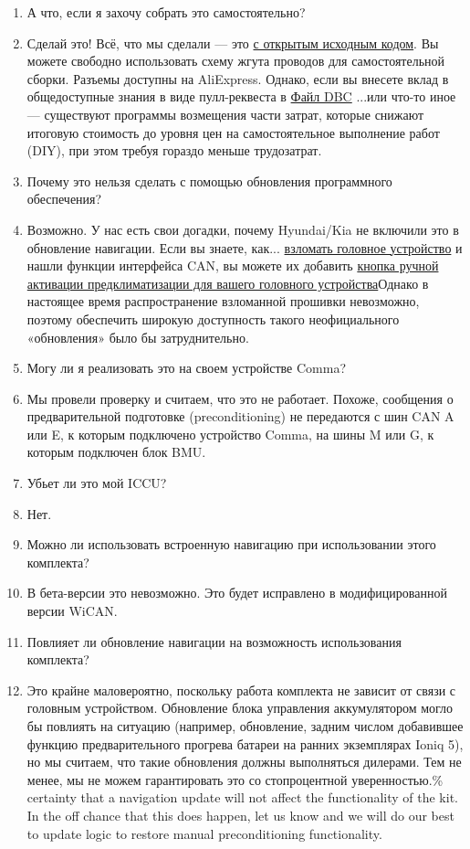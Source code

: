 \documentclass[superscriptaddress,onecolumn,floatfix]{revtex4-2}
\begin{document}
\begin{enumerate}
  \item[В:] А что, если я захочу собрать это самостоятельно?
  \item[A:] Сделай это! Всё, что мы сделали — это \href{https://github.com/tylerharvey/Ioniq5_CAN}{с открытым исходным кодом}. Вы можете свободно использовать схему жгута проводов для самостоятельной сборки. Разъемы доступны на AliExpress. Однако, если вы внесете вклад в общедоступные знания в виде пулл-реквеста в \href{https://github.com/dragz/egmpdbc}{Файл DBC} ...или что-то иное — существуют программы возмещения части затрат, которые снижают итоговую стоимость до уровня цен на самостоятельное выполнение работ (DIY), при этом требуя гораздо меньше трудозатрат.
  \item[В:] Почему это нельзя сделать с помощью обновления программного обеспечения?
  \item[A:] Возможно. У нас есть свои догадки, почему Hyundai/Kia не включили это в обновление навигации. Если вы знаете, как... \href{https://discord.gg/zyrngQ5qQ}{взломать головное устройство} и нашли функции интерфейса CAN, вы можете их добавить \href{https://www.reddit.com/r/KiaEV6/comments/1jdd56u/comment/mid9xie/}{кнопка ручной активации предклиматизации для вашего головного устройства}Однако в настоящее время распространение взломанной прошивки невозможно, поэтому обеспечить широкую доступность такого неофициального «обновления» было бы затруднительно.
  \item[В:] Могу ли я реализовать это на своем устройстве Comma?
  \item[A:] Мы провели проверку и считаем, что это не работает. Похоже, сообщения о предварительной подготовке (preconditioning) не передаются с шин CAN A или E, к которым подключено устройство Comma, на шины M или G, к которым подключен блок BMU.
  \item[В:] Убьет ли это мой ICCU?
  \item[A:] Нет.
  \item[В:] Можно ли использовать встроенную навигацию при использовании этого комплекта?
  \item[A:] В бета-версии это невозможно. Это будет исправлено в модифицированной версии WiCAN.
  \item[В:] Повлияет ли обновление навигации на возможность использования комплекта?
  \item[A:] Это крайне маловероятно, поскольку работа комплекта не зависит от связи с головным устройством. Обновление блока управления аккумулятором могло бы повлиять на ситуацию (например, обновление, задним числом добавившее функцию предварительного прогрева батареи на ранних экземплярах Ioniq 5), но мы считаем, что такие обновления должны выполняться дилерами. Тем не менее, мы не можем гарантировать это со стопроцентной уверенностью.\% certainty that a navigation update will not affect the functionality of the kit. In the off chance that this does happen, let us know and we will do our best to update logic to restore manual preconditioning functionality.

\end{enumerate}
\end{document}
